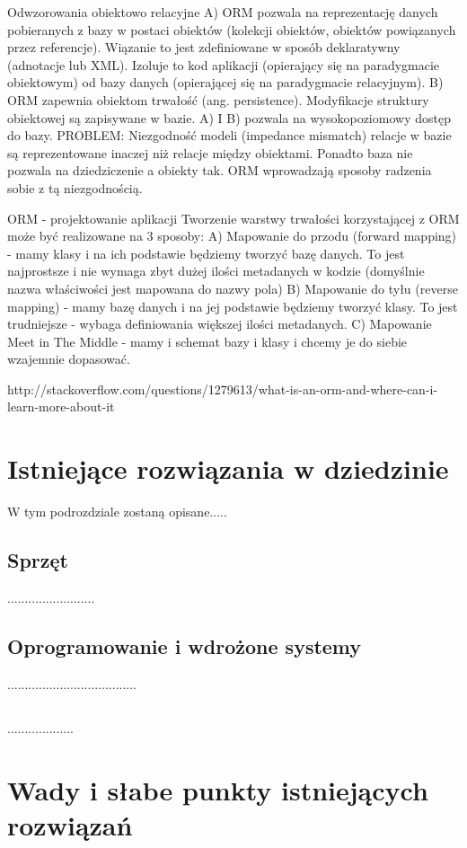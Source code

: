 \documentclass[12pt]{report}
\begin{document}
Odwzorowania obiektowo relacyjne
A) ORM pozwala na reprezentację danych pobieranych z bazy w postaci obiektów (kolekcji obiektów, obiektów powiązanych przez referencje). Wiązanie to jest zdefiniowane w sposób deklaratywny (adnotacje lub XML). Izoluje to kod aplikacji (opierający się na paradygmacie obiektowym) od bazy danych (opierającej się na paradygmacie relacyjnym).
B) ORM zapewnia obiektom trwałość (ang. persistence). Modyfikacje struktury obiektowej są zapisywane w bazie.
A) I B) pozwala na wysokopoziomowy dostęp do bazy. PROBLEM: Niezgodność modeli (impedance mismatch) relacje w bazie są reprezentowane inaczej niż relacje między obiektami.  Ponadto baza nie pozwala na dziedziczenie a obiekty tak. ORM wprowadzają sposoby radzenia sobie z tą niezgodnością.

ORM - projektowanie aplikacji
Tworzenie warstwy trwałości korzystającej z ORM może być realizowane na 3 sposoby:
A) Mapowanie do przodu (forward mapping) - mamy klasy i na ich podstawie będziemy tworzyć bazę danych. To jest najprostsze i nie wymaga zbyt dużej ilości metadanych w kodzie (domyślnie nazwa właściwości jest mapowana do nazwy pola)
B) Mapowanie do tyłu (reverse mapping) - mamy bazę danych i na jej podstawie będziemy tworzyć klasy. To jest trudniejsze - wybaga definiowania większej ilości metadanych.
C) Mapowanie Meet in The Middle - mamy i schemat bazy i klasy i chcemy je do siebie wzajemnie dopasować.

http://stackoverflow.com/questions/1279613/what-is-an-orm-and-where-can-i-learn-more-about-it

\section{Istniejące rozwiązania w dziedzinie}

W tym podrozdziale zostaną opisane.....
\subsection{Sprzęt}
.........................
\subsection{Oprogramowanie i wdrożone systemy}
.....................................
\subsection{}
...................

\section{Wady i słabe punkty istniejących rozwiązań}
\end{document}
